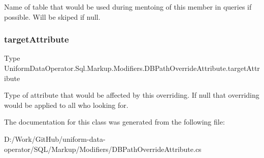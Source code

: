 Name of table that would be used during mentoing of this member in queries if possible. Will be skiped if null. 

\mbox{\label{class_uniform_data_operator_1_1_sql_1_1_markup_1_1_modifiers_1_1_d_b_path_override_attribute_ad6b2408b337cc95c58034f0130c89ac8}} 
\subsubsection{\texorpdfstring{target\+Attribute}{targetAttribute}}
{\footnotesize\ttfamily Type Uniform\+Data\+Operator.\+Sql.\+Markup.\+Modifiers.\+D\+B\+Path\+Override\+Attribute.\+target\+Attribute}



Type of attribute that would be affected by this overriding. If null that overriding would be applied to all who looking for. 



The documentation for this class was generated from the following file\+:\begin{DoxyCompactItemize}
\item 
D\+:/\+Work/\+Git\+Hub/uniform-\/data-\/operator/\+S\+Q\+L/\+Markup/\+Modifiers/D\+B\+Path\+Override\+Attribute.\+cs\end{DoxyCompactItemize}
